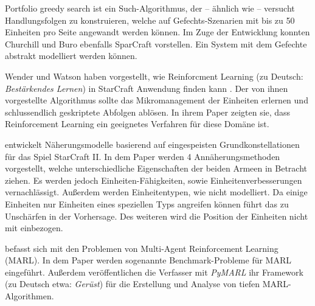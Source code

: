Portfolio greedy search \parencite{6633643} ist ein Such-Algorithmus, der -- ähnlich wie \textcite{AIIDE125469} -- versucht Handlungsfolgen zu konstruieren, welche auf Gefechts-Szenarien mit bis zu 50 Einheiten pro Seite angewandt werden können. Im Zuge der Entwicklung konnten Churchill und Buro ebenfalls SparCraft vorstellen. Ein System mit dem Gefechte abstrakt modelliert werden können. 

Wender und Watson haben vorgestellt, wie Reinforcment Learning (zu Deutsch: \textit{Bestärkendes Lernen}) in StarCraft Anwendung finden kann \parencite{6374183}. Der von ihnen vorgestellte Algorithmus sollte das Mikromanagement der Einheiten erlernen und schlussendlich geskriptete Abfolgen ablösen. In ihrem Paper zeigten sie, dass Reinforcement Learning ein geeignetes Verfahren für diese Domäne ist. 

\textcite{DBLP:journals/corr/HelmkeKW14} entwickelt Näherungsmodelle basierend auf eingespeisten Grundkonstellationen für das Spiel StarCraft II. In dem Paper werden 4 Annäherungsmethoden vorgestellt, welche unterschiedliche Eigenschaften der beiden Armeen in Betracht ziehen. Es werden jedoch Einheiten-Fähigkeiten, sowie Einheitenverbesserungen vernachlässigt. Außerdem werden Einheitentypen, wie nicht modelliert. Da einige Einheiten nur Einheiten eines speziellen Typs angreifen können führt das zu Unschärfen in der Vorhersage. Des weiteren wird die Position der Einheiten nicht mit einbezogen. 

\textcite{samvelyan2019starcraft} befasst sich mit den Problemen von Multi-Agent Reinforcement Learning (MARL). In dem Paper werden sogenannte Benchmark-Probleme für MARL eingeführt. Außerdem veröffentlichen die Verfasser mit \textit{PyMARL} ihr Framework (zu Deutsch etwa: \textit{Gerüst}) für die Erstellung und Analyse von tiefen MARL-Algorithmen. 
